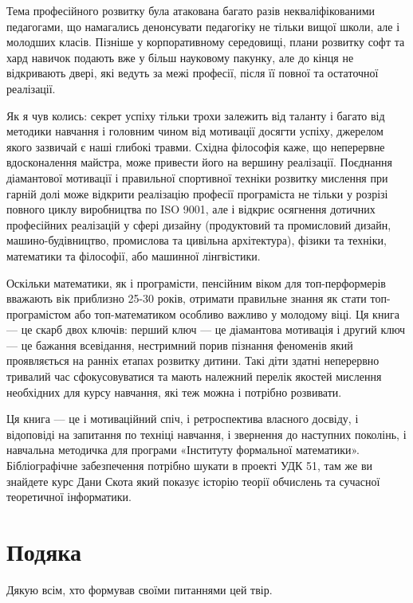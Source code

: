 Тема професійного розвитку була атакована багато разів некваліфікованими педагогами, що намагались денонсувати педагогіку не тільки вищої школи, але і молодших класів. Пізніше у корпоративному середовищі, плани розвитку софт та хард навичок подають вже у більш науковому пакунку, але до кінця не відкривають двері, які ведуть за межі професії, після її повної та остаточної реалізації.

Як я чув колись: секрет успіху тільки трохи залежить від таланту і багато від методики навчання і головним чином від мотивації досягти успіху, джерелом якого зазвичай є наші глибокі травми. Східна філософія каже, що неперервне вдосконалення майстра, може привести його на вершину реалізації. Поєднання діамантової мотивації і правильної спортивної техніки розвитку мислення при гарній долі може відкрити реалізацію професії програміста не тільки у розрізі повного циклу виробництва по ISO 9001, але і відкриє осягнення дотичних професійних реалізацій у сфері дизайну (продуктовий та промисловий дизайн, машино-будівництво, промислова та цивільна архітектура), фізики та техніки, математики та філософії, або машинної лінгвістики.

Оскільки математики, як і програмісти, пенсійним віком для топ-перформерів вважають вік приблизно 25-30 років, отримати правильне знання як стати топ-програмістом або топ-математиком особливо важливо у молодому віці. Ця книга — це скарб двох ключів: перший ключ — це діамантова мотивація і другий ключ — це бажання всевідання, нестримний порив пізнання феноменів який проявляється на ранніх етапах розвитку дитини. Такі діти здатні неперервно тривалий час сфокусовуватися та мають належний перелік якостей мислення необхідних для курсу навчання, які теж можна і потрібно розвивати.

Ця книга — це і мотиваційний спіч, і ретроспектива власного досвіду, і відоповіді на запитання по техніці навчання, і звернення до наступних поколінь, і навчальна методичка для програми «Інституту формальної математики». Бібліографічне забезпечення потрібно шукати в проекті УДК 51, там же ви знайдете курс Дани Скота який показує історію теорії обчислень та сучасної теоретичної інформатики.

\newpage
\section*{Подяка}

Дякую всім, хто формував своїми питаннями цей твір.

\normalsize
